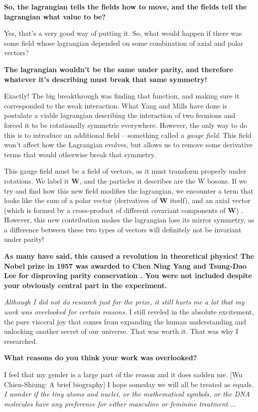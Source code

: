\documentclass{article}
\newcommand{\q}[1]{\vspace{10pt}
\textbf{#1}
\vspace{0pt}}
\begin{document}
\begin{multicols}{2}
\q{So, the lagrangian tells the fields how to move, and the fields tell the lagrangian what value to be?}

Yes, that’s a very good way of putting it. So, what would happen if there was some field whose lagrangian depended on some combination of axial and polar vectors?

\q{The lagrangian wouldn’t be the same under parity, and therefore whatever it’s describing must break that same symmetry!}

Exactly! The big breakthrough was finding that function, and making sure it corresponded to the weak interaction. What Yang and Mills have done is postulate a viable lagrangian describing the interaction of two fermions and forced it to be rotationally symmetric everywhere. However, the only way to do this is to introduce an additional field – something called a \textit{gauge field}. This field won’t affect how the Lagrangian evolves, but allows us to remove some derivative terms that would otherwise break that symmetry.

This gauge field must be a field of vectors, as it must transform properly under rotations. We label it \textbf{W}, and the particles it describes are the W bosons. If we try and find how this new field modifies the lagrangian, we encounter a term that looks like the sum of a polar vector (derivatives of \textbf{W} itself), and an axial vector (which is formed by a cross-product of different covariant components of \textbf{W}) \cite{J1}. However, this new contribution makes the lagrangian lose its mirror symmetry, as a difference between these two types of vectors will definitely not be invariant under parity!

\q{As many have said, this caused a revolution in theoretical physics! The Nobel prize in 1957 was awarded to Chen Ning Yang and Tsung-Dao Lee for disproving parity conservation \cite{N8}. You were not included despite your obviously central part in the experiment.}

\textit{Although I did not do research just for the prize, it still hurts me a lot that my work was overlooked for certain reasons.} I still reveled in the absolute excitement, the pure visceral joy that comes from expanding the human understanding and unlocking another secret of our universe. That was worth it. That was why I researched.

\q{What reasons do you think your work was overlooked?}

I feel that my gender is a large part of the reason and it does sadden me. [Wu Chien-Shiung: A brief biography] I hope someday we will all be treated as equals. \textit{I wonder if the tiny atoms and nuclei, or the mathematical symbols, or the DNA molecules have any preference for either masculine or feminine treatment} \cite{N9}...


\end{multicols}
\end{document}
